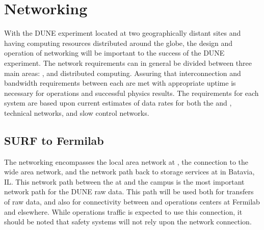 \documentclass[../main-v1.tex]{subfiles}
\begin{document}
\chapter{Networking }
\label{ch:netw}





With the DUNE experiment located at two geographically distant sites and having computing resources distributed around the globe, the design and operation of networking will be important to the success of the DUNE experiment. The network requirements can in general be divided between three main areas: %
,  and distributed computing. Assuring that interconnection and bandwidth requirements between each are met with appropriate uptime is necessary for operations and successful physics results. The requirements for each system are based upon current estimates of data rates for both the  and  , technical networks, and slow control networks.

\section{SURF to Fermilab}

The  networking encompasses the local area network at , the connection to the wide area network, and the network path back to storage services at  in Batavia, IL. This network path between the  at  and the  campus is the most important network path for the DUNE raw data. This path will be used both for transfers of raw data, and also for connectivity between  and operations centers at Fermilab and elsewhere. While operations traffic is expected to use this connection, it should be noted that safety systems will not rely upon the network connection.
\end{document}
